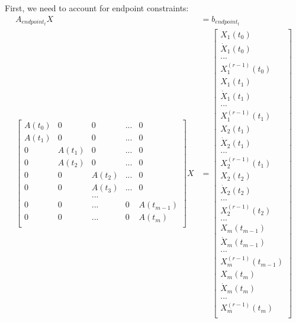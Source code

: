\documentclass[11pt]{article}
\begin{document}
\mbox{} \newline
First, we need to account for endpoint constraints: 
\begin{align*}
A_{endpoint_t} X &= b_{endpoint_t} \\
\begin{bmatrix}
 A(t_0) & 0 & 0 & ... & 0 \\
 A(t_1) & 0 & 0 & ... & 0 \\
 0 & A(t_1) & 0 & ... & 0 \\
 0 & A(t_2) & 0 & ... & 0 \\
 0 & 0 & A(t_2) & ... & 0 \\
 0 & 0 & A(t_3) & ... & 0 \\
 & & ... & & \\
 0 & 0 & ... & 0 & A(t_{m-1}) \\
 0 & 0 & ... & 0 & A(t_m)  \\
 \end{bmatrix}
 X 
 &= 
 \begin{bmatrix}
  X_1 (t_0) \\
  \dot{X}_1 (t_0) \\
  ... \\
  X^{(r-1)}_1 (t_0) \\
    X_1 (t_1) \\
  \dot{X}_1 (t_1) \\
  ... \\
  X^{(r-1)}_1 (t_1) \\
     X_2 (t_1) \\
  \dot{X}_2 (t_1) \\
  ... \\
  X^{(r-1)}_2 (t_1) \\
     X_2 (t_2) \\
  \dot{X}_2 (t_2) \\
  ... \\
  X^{(r-1)}_2 (t_2) \\
  ... \\
     X_m (t_{m-1}) \\
  \dot{X}_m (t_{m-1}) \\
  ... \\
  X^{(r-1)}_m (t_{m-1}) \\
     X_m (t_m) \\
  \dot{X}_m (t_m) \\
  ... \\
  X^{(r-1)}_m (t_m) \\
 \end{bmatrix} 
\end{align*}
\end{document}
